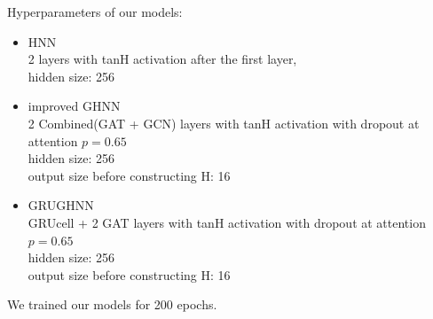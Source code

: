 Hyperparameters of our models:
\begin{itemize}
	\item HNN\\ 
	2 layers with tanH activation after the first layer, \\
	hidden size: 256
	\item improved GHNN\\ 
	2 Combined(GAT + GCN) layers with tanH activation with dropout at attention $p=0.65$\\
	hidden size: 256\\
	output size before constructing H: 16
	\item GRUGHNN\\ 
	GRUcell + 2 GAT layers with tanH activation with dropout at attention $p=0.65$\\
	hidden size: 256\\
	output size before constructing H: 16
\end{itemize}
We trained our models for 200 epochs.
